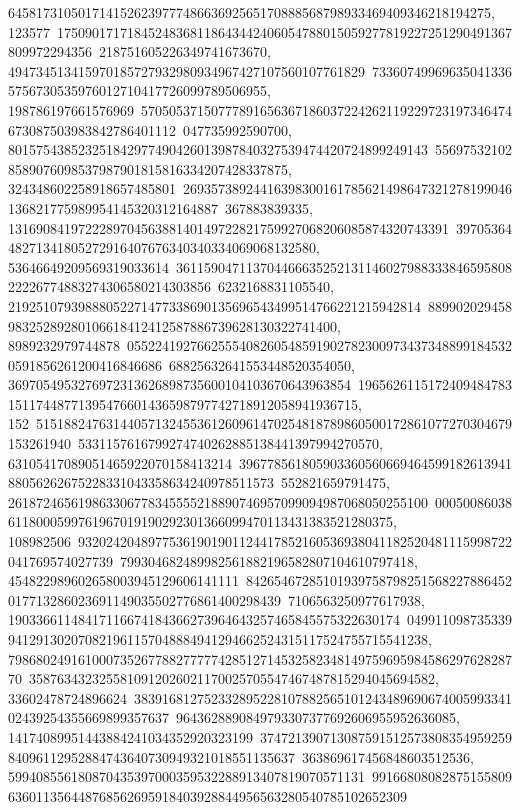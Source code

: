 {{{645817310501714152623977748663692565170888568798933469409346218194275, 123577\
17509017171845248368118643442406054788015059277819227251290491367809972294356\
218751605226349741673670, 494734513415970185727932980934967427107560107761829\
733607499696350413365756730535976012710417726099789506955, 198786197661576969\
57050537150777891656367186037224262119229723197346474673087503983842786401112\
047735992590700, 801575438523251842977490426013987840327539474420724899249143\
556975321028589076098537987901815816334207428337875, 324348602258918657485801\
26935738924416398300161785621498647321278199046136821775989954145320312164887\
367883839335, 131690841972228970456388140149722821759927068206085874320743391\
3970536448271341805272916407676340340334069068132580, 53646649209569319033614\
36115904711370446663525213114602798833384659580822226774883274306580214303856\
6232168831105540, 21925107939888052271477338690135696543499514766221215942814\
88990202945898325289280106618412412587886739628130322741400, 8989232979744878\
05522419276625554082605485919027823009734373488991845320591856261200416846686\
68825632641553448520354050, 3697054953276972313626898735600104103670643963854\
196562611517240948478315117448771395476601436598797742718912058941936715, 152\
51518824763144057132455361260961470254818789860500172861077270304679153261940\
5331157616799274740262885138441397994270570, 63105417089051465922070158413214\
39677856180590336056066946459918261394188056262675228331043358634240978511573\
552821659791475, 261872465619863306778345555218890746957099094987068050255100\
000500860386118000599761967019190292301366099470113431383521280375, 108982506\
93202420489775361901901124417852160536938041182520481115998722041769574027739\
799304682489982561882196582807104610797418, 454822989602658003945129606141111\
84265467285101939758798251568227886452017713286023691149035502776861400298439\
7106563250977617938, 19033661148417116674184366273964643257465845575322630174\
049911098735339941291302070821961157048884941294662524315117524755715541238, 
   79868024916100073526778827777742851271453258234814975969598458629762828770\
3587634323255810912026021170025705547467487815294045694582, 33602478724896624\
38391681275233289522810788256510124348969067400599334102439254355669899357637\
9643628890849793307377692606955952636085, 14174089951443884241034352920323199\
37472139071308759151257380835495925984096112952884743640730949321018551135637\
363869617456848603512536, 599408556180870435397000359532288913407819070571131\
99166808082875155809636011356448768562695918403928844956563280540785102652309\
}}}
